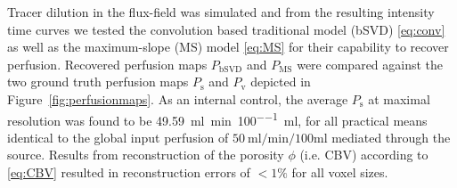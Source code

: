 \documentclass[final,5p,times,twocolumn]{elsarticle}
\begin{document}
	
	Tracer dilution in the flux-field was simulated and from the resulting intensity time curves we tested the convolution based traditional model (bSVD) \eqref{eq:conv} as well as the maximum-slope (MS) model \eqref{eq:MS} for their capability to recover perfusion. Recovered perfusion maps $P_{\mathrm{bSVD}}$ and $P_{\mathrm{MS}}$ were compared against the two ground truth perfusion maps $P_{\mathrm{s}}$ and $P_{\mathrm{v}}$ depicted in Figure~\ref{fig:perfusionmaps}. As an internal control, the average $P_{\mathrm{s}}$ at maximal resolution was found to be \SI{49.59}{\milli\litre\per\minute\per100\milli\litre}, for all practical means identical to the global input perfusion of $\SI{50}{\milli\litre\per\minute\per100\milli\litre}$ mediated through the source.	Results from reconstruction of the porosity $\phi$ (i.e. CBV) according to \eqref{eq:CBV} resulted in reconstruction errors of $<1\%$ for all voxel sizes. 
	
\end{document}
